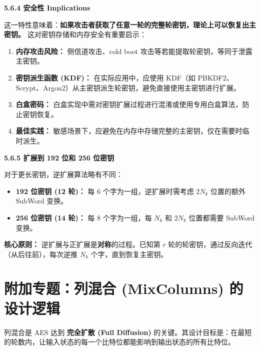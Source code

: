 \documentclass[12pt, a4paper]{article}
\begin{document}
\textbf{5.6.4 安全性 Implications}

\begin{tcolorbox}[notebox=安全警示]
这一特性意味着：\textbf{如果攻击者获取了任意一轮的完整轮密钥，理论上可以恢复出主密钥。} 这对密钥存储和内存安全有重要启示：
\end{tcolorbox}

\begin{enumerate}
    \item \textbf{内存攻击风险：} 侧信道攻击、cold boot 攻击等若能提取轮密钥，等同于泄露主密钥。
    \item \textbf{密钥派生函数 (KDF)：} 在实际应用中，应使用 KDF（如 PBKDF2、Scrypt、Argon2）从主密钥派生轮密钥，避免直接使用主密钥进行扩展。
    \item \textbf{白盒密码：} 白盒实现中需对密钥扩展过程进行混淆或使用专用白盒算法，防止密钥恢复。
    \item \textbf{最佳实践：} 敏感场景下，应避免在内存中存储完整的主密钥，仅在需要时临时派生。
\end{enumerate}

\textbf{5.6.5 扩展到 192 位和 256 位密钥}

对于更长密钥，逆扩展算法略有不同：

\begin{itemize}
    \item \textbf{192 位密钥 (12 轮)：} 每 6 个字为一组，逆扩展时需考虑 $2N_k$ 位置的额外 SubWord 变换。
    \item \textbf{256 位密钥 (14 轮)：} 每 8 个字为一组，每 $N_k$ 和 $2N_k$ 位置都需要 SubWord 变换。
\end{itemize}

\begin{tcolorbox}[notebox=统一规律]
\textbf{核心原则：} 逆扩展与正扩展是\textbf{对称}的过程。已知第 $r$ 轮的轮密钥，通过反向迭代（从后往前），每次逆推 $N_k$ 个字，直到恢复主密钥。
\end{tcolorbox}

\section{\color{aesblue}附加专题：列混合 (MixColumns) 的设计逻辑}

\begin{tcolorbox}[notebox=核心意义]
列混合是 AES 达到 \textbf{完全扩散 (Full Diffusion)} 的关键。其设计目标是：在最短的轮数内，让输入状态的每一个比特位都能影响到输出状态的所有比特位。
\end{tcolorbox}
\end{document}
